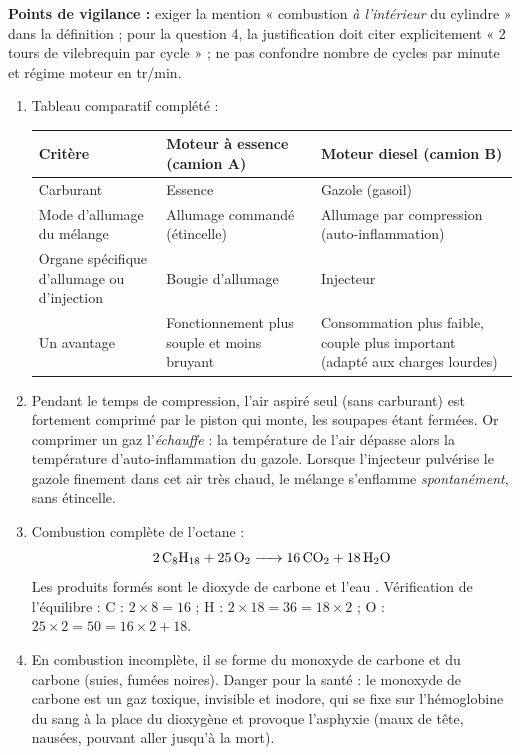 \documentclass[11pt]{article}
\newcommand{\cle}[1]{{\popxbold\color{popdark}#1}}
\begin{document}
\begin{corrige}
\textbf{Points de vigilance :} exiger la mention « combustion \emph{à l'intérieur} du cylindre » dans la définition ; pour la question 4, la justification doit citer explicitement « 2 tours de vilebrequin par cycle » ; ne pas confondre nombre de cycles par minute et régime moteur en tr/min.
\end{corrige}

\begin{corrige}
\begin{enumerate}
\item Tableau comparatif complété :
\begin{center}
\begin{tabularx}{\linewidth}{|l|X|X|}
\hline
\rowcolor{popblueL} Critère & Moteur à essence (camion A) & Moteur diesel (camion B) \\
\hline
Carburant & Essence & Gazole (gasoil) \\
\hline
Mode d'allumage du mélange & Allumage commandé (étincelle) & Allumage par compression (auto-inflammation) \\
\hline
Organe spécifique d'allumage ou d'injection & Bougie d'allumage & Injecteur \\
\hline
Un avantage & Fonctionnement plus souple et moins bruyant & Consommation plus faible, couple plus important (adapté aux charges lourdes) \\
\hline
\end{tabularx}
\end{center}
\item Pendant le temps de compression, l'air aspiré seul (sans carburant) est fortement comprimé par le piston qui monte, les soupapes étant fermées. Or comprimer un gaz l'\emph{échauffe} : la température de l'air dépasse alors la température d'auto-inflammation du gazole. Lorsque l'injecteur pulvérise le gazole finement dans cet air très chaud, le mélange s'enflamme \emph{spontanément}, sans étincelle.
\item Combustion complète de l'octane :
\[ \ce{2C8H18 + 25O2 -> 16CO2 + 18H2O} \]
Les produits formés sont le \cle{dioxyde de carbone}  et l'\cle{eau} . Vérification de l'équilibre : C : $2\times 8 = 16$ ; H : $2\times 18 = 36 = 18\times 2$ ; O : $25\times 2 = 50 = 16\times 2 + 18$.
\item En combustion incomplète, il se forme du \cle{monoxyde de carbone}  et du \cle{carbone}  (suies, fumées noires). Danger pour la santé : le monoxyde de carbone est un gaz toxique, invisible et inodore, qui se fixe sur l'hémoglobine du sang à la place du dioxygène et provoque l'asphyxie (maux de tête, nausées, pouvant aller jusqu'à la mort).

\end{enumerate}
\end{corrige}
\end{document}
